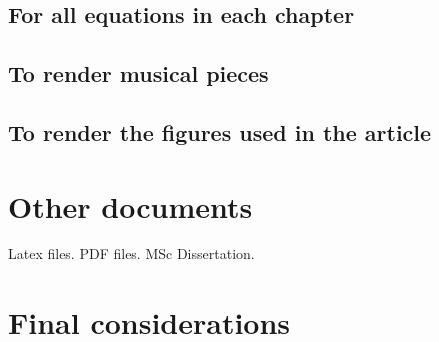 \documentclass{scrreprt}
\begin{document}
\subsection{For all equations in each chapter}
\clearpage
\subsection{To render musical pieces}
\clearpage
\subsection{To render the figures used in the article}

\clearpage
\section{Other documents}
Latex files. PDF files.
MSc Dissertation.

\section{Final considerations}
\end{document}
